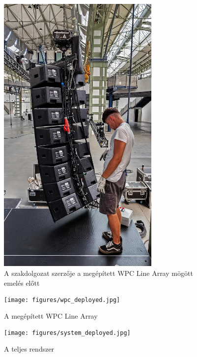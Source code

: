 \begin {figure}[h!]
    \centering
    \includegraphics[width=300px]{figures/danci_wpc.jpg}
    \caption{A szakdolgozat szerzője a megépített WPC Line Array mögött emelés előtt}
\end {figure}
\begin {figure}[h!]
    \centering
	\texttt{[image: figures/wpc\_deployed.jpg]}
	\caption{A megépített WPC Line Array}
\end {figure}
\begin {figure}[h!]
	\centering
	\texttt{[image: figures/system\_deployed.jpg]}
	\caption{A teljes rendszer}
\end {figure}

